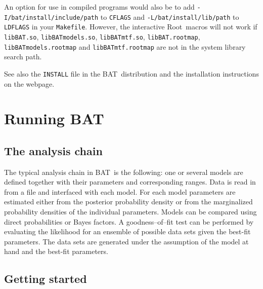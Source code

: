 \documentclass[11pt, a4paper]{article}
\newcommand{\bat}{{\sc BAT}}
\newcommand{\Root}{{\sc Root}}
\begin{document}
An option for use in compiled programs would also be to add
\verb|-I/bat/install/include/path| to \verb|CFLAGS| and
\verb|-L/bat/install/lib/path| to \verb|LDFLAGS| in your
\verb|Makefile|. However, the interactive \Root\ macros will not work if
\verb|libBAT.so|, \verb|libBATmodels.so|, \verb|libBATmtf.so|,
\verb|libBAT.rootmap|, \verb|libBATmodels.rootmap| and
\verb|libBATmtf.rootmap| are not in the system library search path.

See also the \verb|INSTALL| file in the \bat\ distribution and the installation
instructions on the webpage.



\section{Running \bat}
\label{section:running}

\subsection{The analysis chain}
\label{subsection:chain}

The typical analysis chain in \bat\ is the following: one or several
models are defined together with their parameters and corresponding
ranges. Data is read in from a file and interfaced with each
model. For each model parameters are estimated either from the
posterior probability density or from the marginalized probability
densities of the individual parameters. Models can be compared using
direct probabilities or Bayes factors. A goodness--of--fit test can be
performed by evaluating the likelihood for an ensemble of possible
data sets given the best-fit parameters. The data sets are generated
under the assumption of the model at hand and the best-fit
parameters.


\subsection{Getting started}
\label{subsection:start}
\end{document}

